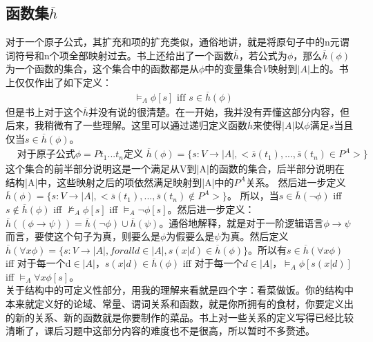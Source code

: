 \documentclass{article}
\begin{document}
\subsection{函数集$\overline{h}$ }
对于一个原子公式，其扩充和项的扩充类似，通俗地讲，就是将原句子中的n元谓词符号和n个项全部映射过去。书上还给出了一个函数$\overline{h}$，若公式为$\phi$，那么$\overline{h}(\phi)$为一个函数的集合，这个集合中的函数都是从$\phi$中的变量集合$V$映射到$|A|$上的。书上仅仅作出了如下定义：
\begin{align*}
    & \models_A \phi[s] \text{    iff     } s \in \overline{h}(\phi)
\end{align*}
但是书上对于这个$\overline{h}$并没有说的很清楚。在一开始，我并没有弄懂这部分内容，但后来，我稍微有了一些理解。这里可以通过递归定义函数$\overline{h}$来使得$|A|$以$\phi$满足$s$当且仅当$s \in \overline{h}(\phi)$。
\begin{align*}
    & \text{对于原子公式}\phi = Pt_1...t_n \text{定义 }\overline{h}(\phi) = \{s:V \rightarrow |A|, <\overline{s}(t_1),...,\overline{s}(t_n)\in P^A>\}
\end{align*}
这个集合的前半部分说明这是一个满足从V到|A|的函数的集合，后半部分说明在结构|A|中，这些映射之后的项依然满足映射到|A|中的$P^A$关系。
然后进一步定义$\overline{h}(\phi) = \{s:V \rightarrow |A|, <\overline{s}(t_1),...,\overline{s}(t_n)\notin P^A>\}$。
所以，当$s \in \overline{h}(\neg \phi)$  iff  $s \notin \overline{h}(\phi)$  iff  $\nvDash_A \phi[s]$  iff  $\models_A \neg \phi[s]$。然后进一步定义：$\overline{h}((\phi \rightarrow \psi)) = \overline{h}(\neg \phi)\cup \overline{h}(\psi)$。通俗地解释，就是对于一阶逻辑语言$\phi \rightarrow \psi$而言，要使这个句子为真，则要么是$\phi$为假要么是$\psi$为真。然后定义$\overline{h}(\forall x \phi) = \{s:V \rightarrow |A|, for all d \in |A|, s(x|d) \in \overline{h}(\phi)\}$。所以有$s \in \overline{h}(\forall x\phi)$  iff  对于每一个d$\in |A|$，$s(x|d) \in \overline{h}(\phi)$  iff  对于每一个$d \in |A|$，$\models_A \phi[s(x|d)]$  iff  $\models_A \forall x \phi[s]$。\\

关于结构中的可定义性部分，用我的理解来看就是四个字：看菜做饭。你的结构中本来就定义好的论域、常量、谓词关系和函数，就是你所拥有的食材，你要定义出的新的关系、新的函数就是你要制作的菜品。书上对一些关系的定义写得已经比较清晰了，课后习题中这部分内容的难度也不是很高，所以暂时不多赘述。\\
\end{document}
